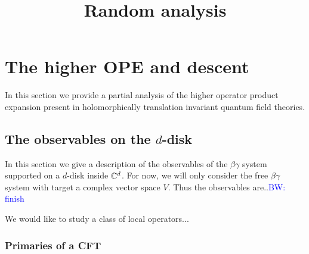 \documentclass[10pt]{amsart}
\title{Random analysis}
\def\brian{\textcolor{blue}{BW: }\textcolor{blue}}
\begin{document}
\maketitle

\section{The higher OPE and descent}

In this section we provide a partial analysis of the higher operator product expansion present in holomorphically translation invariant quantum field theories. 

\subsection{The observables on the $d$-disk}

In this section we give a description of the observables of the $\beta\gamma$ system supported on a $d$-disk inside $\mathbb C^d$. 
For now, we will only consider the free $\beta\gamma$ system with target a complex vector space $V$. 
Thus the observables are..\brian{finish}

We would like to study a class of local operators...

\subsubsection{Primaries of a CFT}
\end{document}
